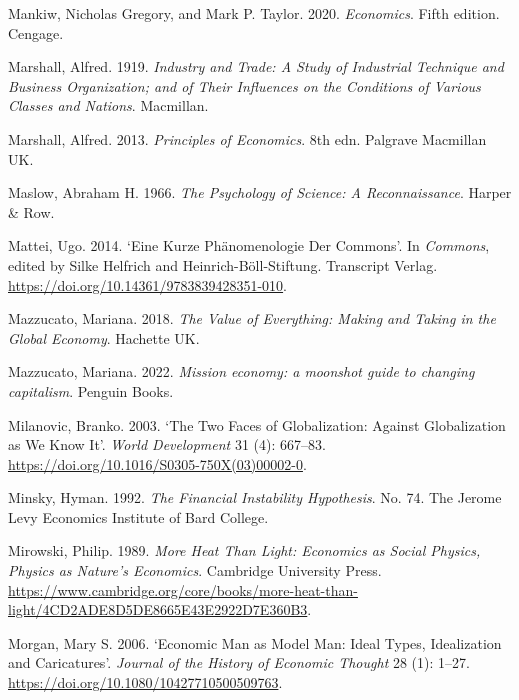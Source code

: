 \documentclass[
  british,
  a4paper,
  DIV=11,
  numbers=noendperiod,
  oneside,
  openany]{scrreprt}
\newlength{\cslhangindent}
\newenvironment{CSLReferences}[2] %
 {\begin{list}{}{%
  \setlength{\itemindent}{0pt}
  \setlength{\leftmargin}{0pt}
  \setlength{\parsep}{0pt}
  \ifodd #1
   \setlength{\leftmargin}{\cslhangindent}
   \setlength{\itemindent}{-1\cslhangindent}
  \fi
  \setlength{\itemsep}{#2\baselineskip}}}
 {\end{list}}
\begin{document}
\begin{CSLReferences}{1}{1}
Mankiw, Nicholas Gregory, and Mark P. Taylor. 2020. \emph{Economics}.
Fifth edition. Cengage.

Marshall, Alfred. 1919. \emph{Industry and Trade: A Study of Industrial
Technique and Business Organization; and of Their Influences on the
Conditions of Various Classes and Nations}. Macmillan.

Marshall, Alfred. 2013. \emph{Principles of Economics}. 8th edn.
Palgrave Macmillan UK.

Maslow, Abraham H. 1966. \emph{The Psychology of Science: A
Reconnaissance}. Harper \& Row.

Mattei, Ugo. 2014. {`Eine Kurze {Phänomenologie} Der {Commons}'}. In
\emph{Commons}, edited by Silke Helfrich and Heinrich-Böll-Stiftung.
Transcript Verlag. \url{https://doi.org/10.14361/9783839428351-010}.

Mazzucato, Mariana. 2018. \emph{The Value of Everything: Making and
Taking in the Global Economy}. Hachette UK.

Mazzucato, Mariana. 2022. \emph{Mission economy: a moonshot guide to
changing capitalism}. Penguin Books.

Milanovic, Branko. 2003. {`The Two Faces of Globalization: Against
Globalization as We Know It'}. \emph{World Development} 31 (4): 667--83.
\url{https://doi.org/10.1016/S0305-750X(03)00002-0}.

Minsky, Hyman. 1992. \emph{The Financial Instability Hypothesis}. No.
74. The Jerome Levy Economics Institute of Bard College.

Mirowski, Philip. 1989. \emph{More Heat Than Light: Economics as Social
Physics, Physics as Nature's Economics}. Cambridge University Press.
\url{https://www.cambridge.org/core/books/more-heat-than-light/4CD2ADE8D5DE8665E43E2922D7E360B3}.

Morgan, Mary S. 2006. {`Economic Man as Model Man: Ideal Types,
Idealization and Caricatures'}. \emph{Journal of the History of Economic
Thought} 28 (1): 1--27. \url{https://doi.org/10.1080/10427710500509763}.


\end{CSLReferences}
\end{document}
